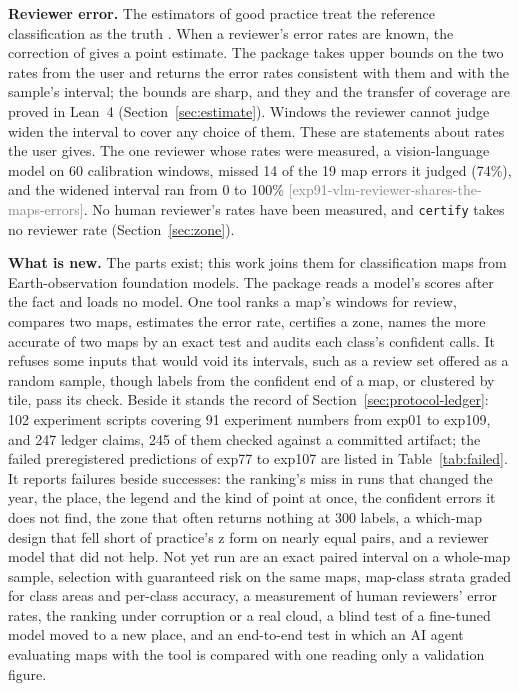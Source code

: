 \documentclass[11pt,a4paper]{article}
\newcommand{\claim}[1]{{\scriptsize\textsf{\textcolor{gray}{[#1]}}}}
\newcommand{\code}[1]{\texttt{#1}}
\begin{document}
\textbf{Reviewer error.} The estimators of good practice treat the reference classification as the truth
\citep{olofsson2014}. When a reviewer's error rates are known, the correction of \citet{rogan1978} gives a point
estimate. The package takes upper bounds on the two rates from the user and returns the error rates consistent with them
and with the sample's interval; the bounds are sharp, and they and the transfer of coverage are proved in Lean~4
(Section~\ref{sec:estimate}). Windows the reviewer cannot judge widen the interval to cover any choice of them. These
are statements about rates the user gives. The one reviewer whose rates were measured, a vision-language model on 60
calibration windows, missed 14 of the 19 map errors it judged (74\%), and the widened interval ran from 0 to 100\%
\claim{exp91-vlm-reviewer-shares-the-maps-errors}. No human reviewer's rates have been measured, and \code{certify}
takes no reviewer rate (Section~\ref{sec:zone}).

\textbf{What is new.} The parts exist; this work joins them for classification maps from Earth-observation foundation
models. The package reads a model's scores after the fact and loads no model. One tool ranks a map's windows for review,
compares two maps, estimates the error rate, certifies a zone, names the more accurate of two maps by an exact
test and audits each class's confident calls. It refuses some inputs that would void its intervals, such as a review set offered as a random
sample, though labels from the confident end of a map, or clustered by tile, pass its check. Beside it stands the record
of Section~\ref{sec:protocol-ledger}: 102 experiment scripts covering 91 experiment numbers from exp01 to
exp109, and 247 ledger claims, 245 of them checked against a committed artifact; the failed preregistered predictions
of exp77 to exp107 are listed in Table~\ref{tab:failed}. It reports failures beside successes: the ranking's miss in runs that changed the year,
the place, the legend and the kind of point at once, the confident errors it does not find, the zone that often returns
nothing at 300 labels, a which-map design that fell short of practice's z form on nearly equal pairs, and a reviewer
model that did not help. Not yet run are an exact paired interval on a whole-map sample, selection with guaranteed risk
on the same maps, map-class strata graded for class areas and per-class accuracy, a measurement of human reviewers' error rates, the ranking
under corruption or a real cloud, a blind test of a fine-tuned model moved to a new place, and an end-to-end test in which
an AI agent evaluating maps with the tool is compared with one reading only a validation figure.
\end{document}
